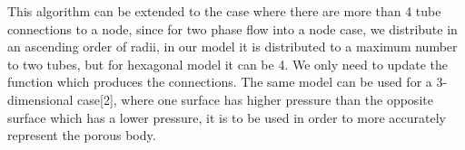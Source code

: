 This algorithm can be extended to the case where there are more than 4 tube connections to a node, since for two phase flow into a node case, we distribute in an ascending order of radii, in our model it is distributed to a maximum number to two tubes, but for hexagonal model it can be 4. We only need to update the function which produces the connections. The same model can be used for a 3-dimensional case[2], where one surface has higher pressure than the opposite surface which has a lower pressure, it is to be used in order to more accurately represent the porous body.


